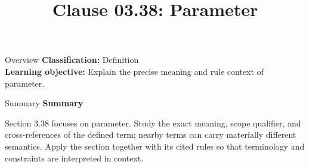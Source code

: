 \documentclass[10pt,letterpaper]{article}
\title{Clause 03.38: Parameter}
\author{}
\date{}
\begin{document}
\maketitle
\begin{CornellOverviewBox}{Overview}
\textbf{Classification:} Definition\\[2pt]
\textbf{Learning objective:} Explain the precise meaning and rule context of parameter.
\end{CornellOverviewBox}\begin{CornellSummaryBox}{Summary}
{\sffamily\bfseries\color{Accent} Summary}\par\vspace{3pt}Section 3.38 focuses on parameter. Study the exact meaning, scope qualifier, and cross-references of the defined term; nearby terms can carry materially different semantics. Apply the section together with its cited rules so that terminology and constraints are interpreted in context.
\end{CornellSummaryBox}
\end{document}
